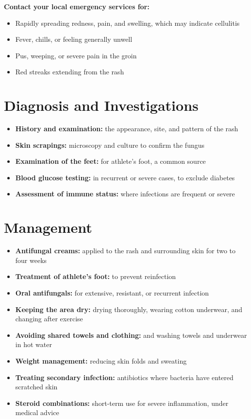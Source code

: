 \textbf{Contact your local emergency services for:}
\begin{itemize}
    \item Rapidly spreading redness, pain, and swelling, which may indicate cellulitis
    \item Fever, chills, or feeling generally unwell
    \item Pus, weeping, or severe pain in the groin
    \item Red streaks extending from the rash
\end{itemize}

\section*{Diagnosis and Investigations}
\begin{itemize}
    \item \textbf{History and examination:} the appearance, site, and pattern of the rash
    \item \textbf{Skin scrapings:} microscopy and culture to confirm the fungus
    \item \textbf{Examination of the feet:} for athlete's foot, a common source
    \item \textbf{Blood glucose testing:} in recurrent or severe cases, to exclude diabetes
    \item \textbf{Assessment of immune status:} where infections are frequent or severe
\end{itemize}

\section*{Management}
\begin{itemize}
    \item \textbf{Antifungal creams:} applied to the rash and surrounding skin for two to four weeks
    \item \textbf{Treatment of athlete's foot:} to prevent reinfection
    \item \textbf{Oral antifungals:} for extensive, resistant, or recurrent infection
    \item \textbf{Keeping the area dry:} drying thoroughly, wearing cotton underwear, and changing after exercise
    \item \textbf{Avoiding shared towels and clothing:} and washing towels and underwear in hot water
    \item \textbf{Weight management:} reducing skin folds and sweating
    \item \textbf{Treating secondary infection:} antibiotics where bacteria have entered scratched skin
    \item \textbf{Steroid combinations:} short-term use for severe inflammation, under medical advice
\end{itemize}

